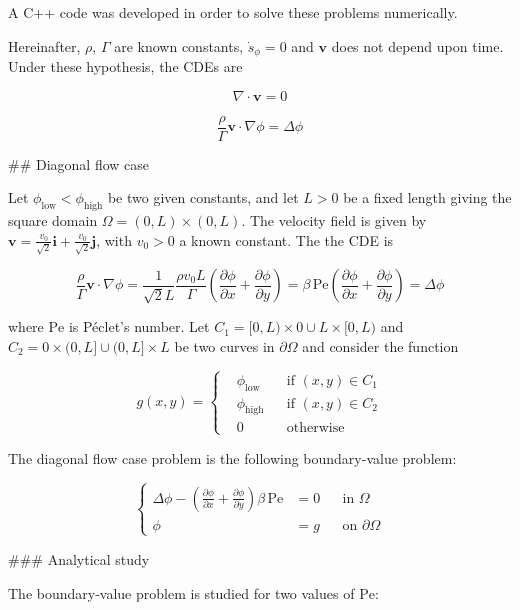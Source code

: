 A C++ code was developed in order to solve these problems numerically. 

Hereinafter, $\rho$, $\Gamma$ are known constants, $\dot{s}_\phi = 0$ and $\mathbf{v}$ does not depend upon time. Under these hypothesis, the CDEs are

$$
\nabla \cdot \mathbf{v} = 0
$$

$$
\frac{\rho}{\Gamma} \mathbf{v} \cdot \nabla \phi = \Delta \phi
$$

## Diagonal flow case

Let $\phi_\text{low} < \phi_\text{high}$ be two given constants, and let $L > 0$ be a fixed length giving the square domain $\Omega = (0,L) \times (0,L)$. The velocity field is given by $\mathbf{v} = \frac{v_0}{\sqrt{2}} \mathbf{i} + \frac{v_0}{\sqrt{2}} \mathbf{j}$, with $v_0 > 0$ a known constant. The the CDE is

$$
\frac{\rho}{\Gamma} \mathbf{v} \cdot \nabla \phi = \frac{1}{\sqrt{2} L} \frac{\rho v_0 L}{\Gamma} \left( \frac{\partial \phi}{\partial x} + \frac{\partial \phi}{\partial y} \right) = \beta \, \mathrm{Pe} \left( \frac{\partial \phi}{\partial x} + \frac{\partial \phi}{\partial y} \right) = \Delta \phi
$$

where $\mathrm{Pe}$ is Péclet's number. Let $C_1 = [0,L) \times {0} \cup {L} \times [0,L)$ and $C_2 = {0} \times (0,L] \cup (0,L] \times {L}$ be two curves in $\partial \Omega$ and consider the function

$$
g(x,y) = 
\left\{
    \begin{aligned}
        &\phi_\text{low} & &\text{if } (x,y) \in C_1 \\
        &\phi_\text{high} & &\text{if } (x,y) \in C_2 \\
        &0 & &\text{otherwise}
    \end{aligned}
\right.
$$

The diagonal flow case problem is the following boundary-value problem:

$$
\left\{
    \begin{aligned} 
        \Delta \phi - \left( \frac{\partial \phi}{\partial x} + \frac{\partial \phi}{\partial y} \right) \beta \, \mathrm{Pe} &= 0 & &\text{in } \Omega \\
        \phi &= g & &\text{on } \partial \Omega
    \end{aligned}
\right.
$$

### Analytical study

The boundary-value problem is studied for two values of $\mathrm{Pe}$:


